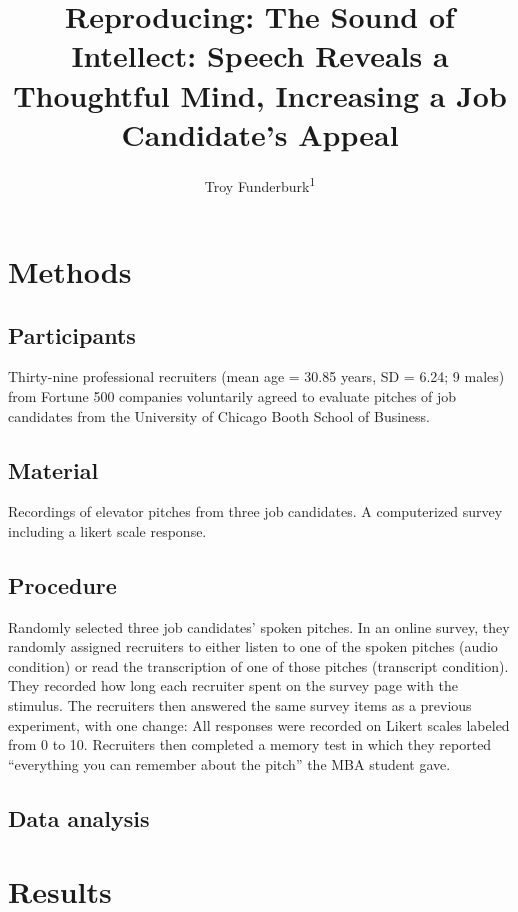 \documentclass[man]{apa6}
\title{Reproducing: The Sound of Intellect: Speech Reveals a Thoughtful Mind,
Increasing a Job Candidate's Appeal}
\author{Troy Funderburk\textsuperscript{1}}
\date{}
\affiliation{
\vspace{0.5cm}
\textsuperscript{1} Brooklyn College}
\begin{document}
\maketitle

\section{Methods}\label{methods}

\subsection{Participants}\label{participants}

Thirty-nine professional recruiters (mean age = 30.85 years, SD = 6.24;
9 males) from Fortune 500 companies voluntarily agreed to evaluate
pitches of job candidates from the University of Chicago Booth School of
Business.

\subsection{Material}\label{material}

Recordings of elevator pitches from three job candidates. A computerized
survey including a likert scale response.

\subsection{Procedure}\label{procedure}

Randomly selected three job candidates' spoken pitches. In an online
survey, they randomly assigned recruiters to either listen to one of the
spoken pitches (audio condition) or read the transcription of one of
those pitches (transcript condition). They recorded how long each
recruiter spent on the survey page with the stimulus. The recruiters
then answered the same survey items as a previous experiment, with one
change: All responses were recorded on Likert scales labeled from 0 to
10. Recruiters then completed a memory test in which they reported
\enquote{everything you can remember about the pitch} the MBA student
gave.

\subsection{Data analysis}\label{data-analysis}

\section{Results}\label{results}
\end{document}
